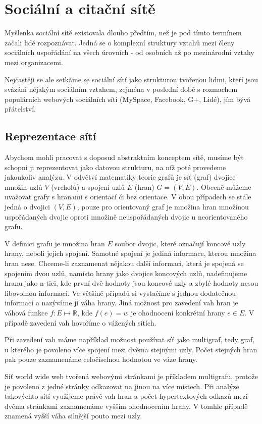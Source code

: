 \documentclass{bakalarka}
\begin{document}
\chapter{Sociální a citační sítě}

Myšlenka sociální sítě existovala dlouho předtím, než je pod tímto termínem
začali lidé rozpoznávat. Jedná se o komplexní struktury vztahů mezi členy
sociálních uspořádání na všech úrovních - od osobních až po mezinárodní vztahy
mezi organizacemi.

Nejčastěji se ale setkáme se sociální sítí jako strukturou tvořenou lidmi,
kteří jsou svázáni nějakým sociálním vztahem, zejména v poslední době s
rozmachem populárních webových sociálních sítí (MySpace, Facebook, G+, Lidé),
jím bývá přátelství.

\section{Reprezentace sítí}
Abychom mohli pracovat s doposud abstraktním konceptem sítě, musíme být schopni
ji reprezentovat jako datovou strukturu, na níž poté provedeme jakoukoliv
analýzu.
V odvětví matematiky teorie grafů je síť (graf) dvojice množin uzlů $V$
(vrcholů) a spojení uzlů $E$ (hran) $G = (V, E)$.  Obecně můžeme uvažovat grafy
s hranami s orientací či bez orientace. V obou případech se stále jedná o
dvojici $(V, E)$, pouze pro orientovaný graf je množina hran množinou
uspořádaných dvojic oproti množině neuspořádaných dvojic u neorientovaného
grafu.

V definici grafu je množina hran $E$ soubor dvojic, které označují koncové uzly
hrany, neboli jejich spojení. Samotné spojení je jediná informace, kterou
množina hran nese. Chceme-li zaznamenat nějakou další informaci, která je
spojená se spojením dvou uzlů, namísto hrany jako dvojice koncových uzlů,
nadefinujeme hranu jako n-tici, kde první dvě hodnoty jsou koncové uzly a zbylé
hodnoty nesou libovolnou informaci. Ve většině případů si vystačíme s jednou
dodatečnou informací a nazýváme ji váha hrany. Jiná možnost pro zavedení vah
hran je váhová funkce $f: E \mapsto \mathbb{R}$, kde $f(e) = w$ je ohodnocení
konkrétní hrany $e \in E$. V případě zavedení vah hovoříme o vážených sítích.

Při zavedení vah máme například možnost používat síť jako multigraf, tedy graf,
u kterého je povoleno více spojení mezi dvěma stejnými uzly. Počet stejných
hran pak pouze zaznamenáme celočíselnou hodnotou ve váze hrany.

Síť world wide web tvořená webovými stránkami je příkladem
multigrafu, protože je povoleno z jedné stránky odkazovat na jinou na více
místech. Při analýze takovýchto sítí využijeme právě vah hran a počet
hypertextových odkazů mezi dvěma stránkami zaznamenáme vyšším ohodnocením
hrany. V tomhle případě znamená vyšší váha silnější pouto mezi uzly.
\end{document}
